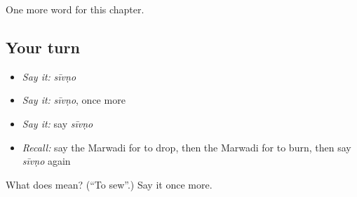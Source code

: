 \begin{grammarlens}[title={What you've built}]
One more word for this chapter.
\end{grammarlens}

\subsection*{Your turn}
\begin{itemize}
\raggedright
  \item \emph{Say it:} \emph{sīvṇo}
  \item \emph{Say it:} \emph{sīvṇo}, once more
  \item \emph{Say it:} say \emph{sīvṇo}
  \item \emph{Recall:} say the Marwadi for to drop, then the Marwadi for to burn, then say \emph{sīvṇo} again
\end{itemize}

\begin{tcolorbox}[breakable,colback=teal!4,colframe=teal!35!black,title={Before you move on}]
What does  mean? (\textquotedblleft{}To sew\textquotedblright{}.) Say it once more.
\end{tcolorbox}
